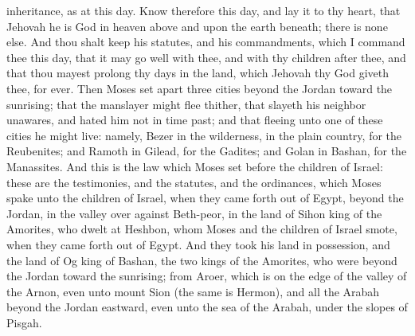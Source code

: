 inheritance, as at this day. Know therefore this day, and lay it to thy heart, that Jehovah he is God in heaven above and upon the earth beneath; there is none else. And thou shalt keep his statutes, and his commandments, which I command thee this day, that it may go well with thee, and with thy children after thee, and that thou mayest prolong thy days in the land, which Jehovah thy God giveth thee, for ever.  Then Moses set apart three cities beyond the Jordan toward the sunrising; that the manslayer might flee thither, that slayeth his neighbor unawares, and hated him not in time past; and that fleeing unto one of these cities he might live: namely, Bezer in the wilderness, in the plain country, for the Reubenites; and Ramoth in Gilead, for the Gadites; and Golan in Bashan, for the Manassites.  And this is the law which Moses set before the children of Israel: these are the testimonies, and the statutes, and the ordinances, which Moses spake unto the children of Israel, when they came forth out of Egypt, beyond the Jordan, in the valley over against Beth-peor, in the land of Sihon king of the Amorites, who dwelt at Heshbon, whom Moses and the children of Israel smote, when they came forth out of Egypt. And they took his land in possession, and the land of Og king of Bashan, the two kings of the Amorites, who were beyond the Jordan toward the sunrising; from Aroer, which is on the edge of the valley of the Arnon, even unto mount Sion (the same is Hermon), and all the Arabah beyond the Jordan eastward, even unto the sea of the Arabah, under the slopes of Pisgah. 

